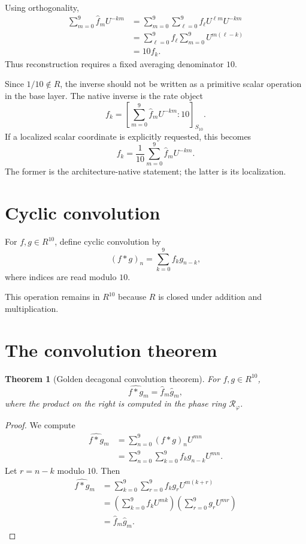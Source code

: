 \documentclass[11pt]{article}
\newtheorem{theorem}[definition]{Theorem}
\newcommand{\ph}{\varphi}
\newcommand{\RR}{\mathcal R_\ph}
\begin{document}
Using orthogonality,
\begin{align*}
    \sum_{m=0}^{9}\widehat f_mU^{-km}
    &=\sum_{m=0}^{9}\sum_{\ell=0}^{9}f_\ell U^{\ell m}U^{-km}\\
    &=\sum_{\ell=0}^{9}f_\ell\sum_{m=0}^{9}U^{m(\ell-k)}\\
    &=10f_k.
\end{align*}
Thus reconstruction requires a fixed averaging denominator $10$.

Since $1/10\notin R$, the inverse should not be written as a primitive scalar operation in the base layer.  The native inverse is the rate object
\[
    f_k=
    \left[
    \sum_{m=0}^{9}\widehat f_mU^{-km}:10
    \right]_{S_{10}}.
\]
If a localized scalar coordinate is explicitly requested, this becomes
\[
    f_k=\frac1{10}\sum_{m=0}^{9}\widehat f_mU^{-km}.
\]
The former is the architecture-native statement; the latter is its localization.

\section{Cyclic convolution}

For $f,g\in R^{10}$, define cyclic convolution by
\[
    (f*g)_n=\sum_{k=0}^{9}f_kg_{n-k},
\]
where indices are read modulo $10$.

This operation remains in $R^{10}$ because $R$ is closed under addition and multiplication.

\section{The convolution theorem}

\begin{theorem}[Golden decagonal convolution theorem]
For $f,g\in R^{10}$,
\[
    \widehat{f*g}_m=\widehat f_m\widehat g_m,
\]
where the product on the right is computed in the phase ring $\RR$.
\end{theorem}

\begin{proof}
We compute
\begin{align*}
    \widehat{f*g}_m
    &=\sum_{n=0}^{9}(f*g)_nU^{mn}\\
    &=\sum_{n=0}^{9}\sum_{k=0}^{9}f_kg_{n-k}U^{mn}.
\end{align*}
Let $r=n-k$ modulo $10$.  Then
\begin{align*}
    \widehat{f*g}_m
    &=\sum_{k=0}^{9}\sum_{r=0}^{9}f_kg_rU^{m(k+r)}\\
    &=\left(\sum_{k=0}^{9}f_kU^{mk}\right)
      \left(\sum_{r=0}^{9}g_rU^{mr}\right)\\
    &=\widehat f_m\widehat g_m.
\end{align*}
\end{proof}
\end{document}
